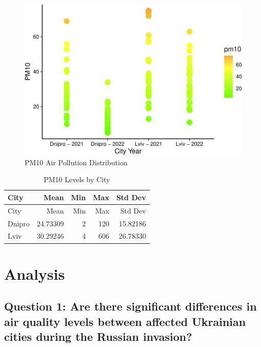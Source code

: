 \documentclass[
  12pt,
]{article}
\begin{document}
\begin{figure}
\centering
\includegraphics{Fontanie_Gordon_Weinberg_Project_files/figure-latex/plot of PM10 air pollution by city year-1.pdf}
\caption{PM10 Air Pollution Distribution}
\end{figure}

\begin{longtable}[]{@{}lrrrr@{}}
\caption{PM10 Levels by City}\tabularnewline
\toprule
City & Mean & Min & Max & Std Dev \\
\midrule
\endfirsthead
\toprule
City & Mean & Min & Max & Std Dev \\
\midrule
\endhead
Dnipro & 24.73309 & 2 & 120 & 15.82186 \\
Lviv & 30.29246 & 4 & 606 & 26.78330 \\
\bottomrule
\end{longtable}

\newpage

\hypertarget{analysis}{%
\section{Analysis}\label{analysis}}

\hypertarget{question-1-are-there-significant-differences-in-air-quality-levels-between-affected-ukrainian-cities-during-the-russian-invasion}{%
\subsection{Question 1: Are there significant differences in air quality
levels between affected Ukrainian cities during the Russian
invasion?}\label{question-1-are-there-significant-differences-in-air-quality-levels-between-affected-ukrainian-cities-during-the-russian-invasion}}
\end{document}
